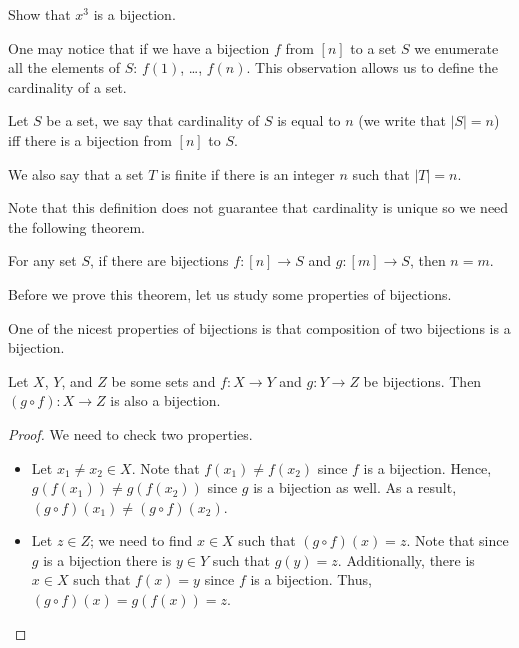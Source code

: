 \begin{exercise}
  Show that $x^3$ is a bijection.
\end{exercise}

One may notice that if we have a bijection $f$ from $[n]$ to a set $S$ we
enumerate all the elements of $S$: $f(1)$, \dots, $f(n)$.
This observation allows us to define the cardinality of a set.
\begin{definition}
  Let $S$ be a set, we say that cardinality of $S$ is equal to $n$ (we write
  that $|S| = n$) iff there is a bijection from $[n]$ to $S$.

  We also say that a set $T$ is finite if there is an integer $n$ such that
  $|T| = n$.
\end{definition}

Note that this definition does not guarantee that cardinality is unique so
we need the following theorem.
\begin{theorem}
\label{theorem:correctness-of-cardinality}
  For any set $S$, if there are bijections $f : [n] \to S$ and $g : [m] \to S$,
  then $n = m$.
\end{theorem}
Before we prove this theorem, let us study some properties of bijections.

One of the nicest properties of bijections is that composition of two bijections
is a bijection.
\begin{theorem}
\label{theorem:bijections-composition}
  Let $X$, $Y$, and $Z$ be some sets and $f : X \to Y$ and $g : Y \to Z$ be
  bijections. Then $(g \circ f) : X \to Z$ is also a bijection.
\end{theorem}
\begin{proof}
  We need to check two properties.
  \begin{itemize}
    \item Let $x_1 \neq x_2 \in X$. Note that $f(x_1) \neq f(x_2)$ since $f$
      is a bijection. Hence, $g(f(x_1)) \neq g(f(x_2))$ since $g$ is a bijection
      as well. As a result, $(g \circ f)(x_1) \neq (g \circ f)(x_2)$.
    \item Let $z \in Z$; we need to find $x \in X$ such that
      $(g \circ f)(x) = z$. Note that since $g$ is a bijection there is
      $y \in Y$ such that $g(y) = z$. Additionally, there is $x \in X$ such
      that $f(x) = y$ since $f$ is a bijection. Thus,
      $(g \circ f)(x) = g(f(x)) = z$.
  \end{itemize}
\end{proof}

